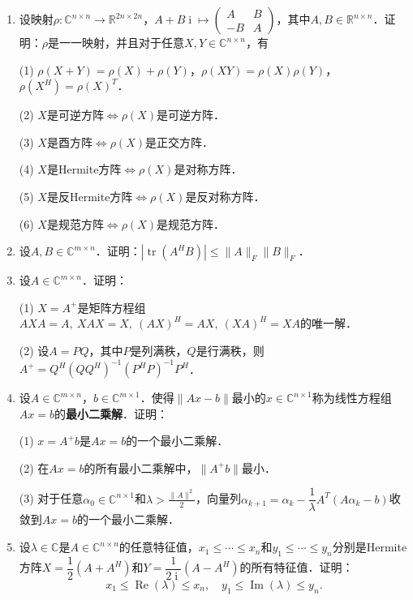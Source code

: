 \documentclass[a4paper,fontset=windows]{ctexbook}
\theoremstyle{definition}
\DeclareMathOperator{\I}{i}
\DeclareMathOperator{\im}{Im}
\DeclareMathOperator{\re}{Re}
\DeclareMathOperator{\tr}{tr}
\renewcommand{\le}{\leqslant}
\begin{document}
\begin{enumerate}
\item 设映射$\rho:\mathbb{C}^{n\times n}\to\mathbb{R}^{2n\times 2n}$，$A+B\I\mapsto\begin{pmatrix}A&B \\ -B&A\end{pmatrix}$，其中$A,B\in\mathbb{R}^{n\times n}$．证明：$\rho$是一一映射，并且对于任意$X,Y\in\mathbb{C}^{n\times n}$，有

(1) $\rho(X+Y)=\rho(X)+\rho(Y)$，$\rho(XY)=\rho(X)\rho(Y)$，$\rho(X^H)=\rho(X)^T$．

(2) $X$是可逆方阵\hspace{37pt}$\Leftrightarrow\rho(X)$是可逆方阵．

(3) $X$是酉方阵\hspace{47pt}$\Leftrightarrow\rho(X)$是正交方阵．

(4) $X$是Hermite方阵\hspace{14pt}$\Leftrightarrow\rho(X)$是对称方阵．

(5) $X$是反Hermite方阵$\Leftrightarrow\rho(X)$是反对称方阵．

(6) $X$是规范方阵\hspace{37pt}$\Leftrightarrow\rho(X)$是规范方阵．

\item 设$A,B\in\mathbb{C}^{m\times n}$．证明：$|\tr(A^HB)|\le\|A\|_F\|B\|_F$．

\item 设$A\in\mathbb{C}^{m\times n}$．证明：

(1) $X=A^+$是矩阵方程组$AXA=A,~XAX=X,~(AX)^H=AX,~(XA)^H=XA$的唯一解．

(2) 设$A=PQ$，其中$P$是列满秩，$Q$是行满秩，则$A^+=Q^H(QQ^H)^{-1}(P^HP)^{-1}P^H$．

\item 设$A\in\mathbb{C}^{m\times n}$，$b\in\mathbb{C}^{m\times 1}$．使得$\|Ax-b\|$最小的$x\in\mathbb{C}^{n\times 1}$称为线性方程组$Ax=b$的{\bf 最小二乘解}．证明：

(1) $x=A^+b$是$Ax=b$的一个最小二乘解．

(2) 在$Ax=b$的所有最小二乘解中，$\|A^+b\|$最小．

(3) 对于任意$\alpha_0\in\mathbb{C}^{n\times 1}$和$\lambda>\frac{\|A\|^2}{2}$，向量列$\alpha_{k+1}=\alpha_k-\dfrac{1}{\lambda}A^T(A\alpha_k-b)$收敛到$Ax=b$的一个最小二乘解．

\item 设$\lambda\in\mathbb{C}$是$A\in\mathbb{C}^{n\times n}$的任意特征值，$x_1\le\cdots\le x_n$和$y_1\le\cdots\le y_n$分别是Hermite方阵$X=\dfrac{1}{2}(A+A^H)$和$Y=\dfrac{1}{2\I}(A-A^H)$的所有特征值．证明：
$$x_1\le\re(\lambda)\le x_n,\quad y_1\le\im(\lambda)\le y_n.$$


\end{enumerate}
\end{document}
